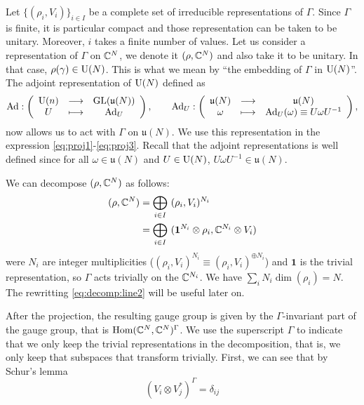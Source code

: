 \documentclass[a4paper,10pt]{article}
\begin{document}
        Let $\{(\rho_i,V_i)\}_{i\in I}$ be a complete set of irreducible representations of $\Gamma$. Since $\Gamma$ is finite, it is particular compact and those representation can be taken to be unitary. Moreover, $i$ takes a finite number of values. Let us consider a representation of $\Gamma$ on $\mathbb{C}^N$, we denote it $(\rho,\mathbb{C}^N)$ and also take it to be unitary. In that case, $\rho(\gamma)\in\text{U}(N)$. This is what we mean by ``the embedding of $\Gamma$ in $\text{U}(N)$''. The adjoint representation of $\text{U}(N)$ defined as
        \begin{equation}
            \text{Ad}:\left(
            \begin{array}{ccc}
                \text{U}(n) & \longrightarrow & \text{GL}(\mathfrak{u}(N)) \\
                U & \longmapsto & \text{Ad}_U
            \end{array}
            \right),\qquad
            \text{Ad}_U:\left(
            \begin{array}{ccc}
                \mathfrak{u}(N) & \longrightarrow & \mathfrak{u}(N) \\
                \omega & \longmapsto & \text{Ad}_U(\omega)\equiv U\omega U^{-1}
            \end{array}
            \right),
        \end{equation}
        now allows us to act with $\Gamma$ on $\mathfrak{u}(N)$. We use this representation in the expression \eqref{eq:proj1}-\eqref{eq:proj3}. Recall that the adjoint representations is well defined since for all $\omega\in\mathfrak{u}(N)$ and $U\in\text{U}(N)$, $U\omega U^{-1}\in\mathfrak{u}(N)$.

        We can decompose $(\rho,\mathbb{C}^N)$ as follows:
        \begin{align}
            (\rho,\mathbb{C}^N) &= \bigoplus_{i\in I}~(\rho_i,V_i)^{N_i} \\
            &= \bigoplus_{i\in I}~(\boldsymbol{1}^{N_i}\otimes\rho_i,\mathbb{C}^{N_i}\otimes V_i) \label{eq:decomp:line2}
        \end{align}
        were $N_i$ are integer multiplicities ($(\rho_i,V_i)^{N_i}\equiv(\rho_i,V_i)^{\oplus N_i}$) and $\boldsymbol{1}$ is the trivial representation, so $\Gamma$ acts trivially on the $\mathbb{C}^{N_i}$. We have $\sum_iN_i\dim(\rho_i)=N$. The rewritting \eqref{eq:decomp:line2} will be useful later on.
        
        After the projection, the resulting gauge group is given by the $\Gamma$-invariant part of the gauge group, that is $\text{Hom}(\mathbb{C}^N,\mathbb{C}^N)^\Gamma$. We use the superscript $\Gamma$ to indicate that we only keep the trivial representations in the decomposition, that is, we only keep that subspaces that transform trivially. First, we can see that by Schur's lemma \marker
        \begin{equation}
            (V_i\otimes V^*_j)^\Gamma=\delta_{ij}
        \end{equation}
        
\end{document}

